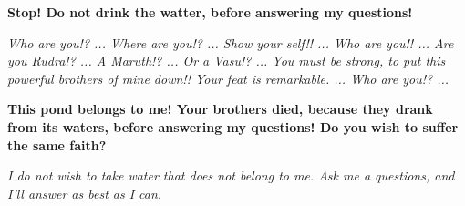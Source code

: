 \textbf{
Stop!
Do not drink the watter, before answering my questions!
}\medskip

\textit{
Who are you!? ...
Where are you!? ...
Show your self!! ...
Who are you!! ...
Are you Rudra!? ...
A Maruth!? ...
Or a Vasu!? ...
You must be strong, to put this powerful brothers of mine down!!
Your feat is remarkable. ...
Who are you!? ...
}\medskip

\textbf{
This pond belongs to me!
Your brothers died, because they drank from its waters, before answering my questions!
Do you wish to suffer the same faith?
}\medskip

\textit{
I do not wish to take water that does not belong to me.
Ask me a questions, and I'll answer as best as I can.
}